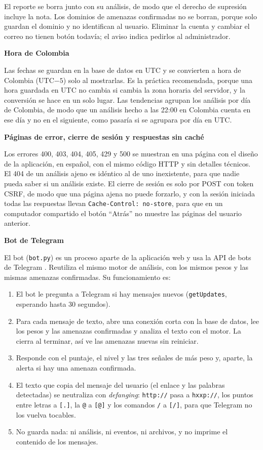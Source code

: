 \documentclass[journal,onecolumn,12pt,draftclsnofoot]{IEEEtran}
\newcommand{\apartado}[1]{\par\medskip\noindent\textbf{#1}\par\smallskip}
\begin{document}
El reporte se borra junto con su análisis, de modo que el derecho de supresión incluye la nota. Los dominios de amenazas confirmadas no se borran, porque solo guardan el dominio y no identifican al usuario. Eliminar la cuenta y cambiar el correo no tienen botón todavía; el aviso indica pedirlos al administrador.

\apartado{Hora de Colombia}

Las fechas se guardan en la base de datos en UTC y se convierten a hora de Colombia (UTC$-5$) solo al mostrarlas. Es la práctica recomendada, porque una hora guardada en UTC no cambia si cambia la zona horaria del servidor, y la conversión se hace en un solo lugar. Las tendencias agrupan los análisis por día de Colombia, de modo que un análisis hecho a las 22:00 en Colombia cuenta en ese día y no en el siguiente, como pasaría si se agrupara por día en UTC.

\apartado{Páginas de error, cierre de sesión y respuestas sin caché}

Los errores 400, 403, 404, 405, 429 y 500 se muestran en una página con el diseño de la aplicación, en español, con el mismo código HTTP y sin detalles técnicos. El 404 de un análisis ajeno es idéntico al de uno inexistente, para que nadie pueda saber si un análisis existe. El cierre de sesión es solo por POST con token CSRF, de modo que una página ajena no puede forzarlo, y con la sesión iniciada todas las respuestas llevan \texttt{Cache-Control: no-store}, para que en un computador compartido el botón ``Atrás'' no muestre las páginas del usuario anterior.

\apartado{Bot de Telegram}

El bot (\texttt{bot.py}) es un proceso aparte de la aplicación web y usa la API de bots de Telegram \cite{telegram}. Reutiliza el mismo motor de análisis, con los mismos pesos y las mismas amenazas confirmadas. Su funcionamiento es:

\begin{enumerate}
  \item El bot le pregunta a Telegram si hay mensajes nuevos (\texttt{getUpdates}, esperando hasta 30 segundos).
  \item Para cada mensaje de texto, abre una conexión corta con la base de datos, lee los pesos y las amenazas confirmadas y analiza el texto con el motor. La cierra al terminar, así ve las amenazas nuevas sin reiniciar.
  \item Responde con el puntaje, el nivel y las tres señales de más peso y, aparte, la alerta si hay una amenaza confirmada.
  \item El texto que copia del mensaje del usuario (el enlace y las palabras detectadas) se neutraliza con \emph{defanging}: \texttt{http://} pasa a \texttt{hxxp://}, los puntos entre letras a \texttt{[.]}, la \texttt{@} a \texttt{[@]} y los comandos \texttt{/} a \texttt{[/]}, para que Telegram no los vuelva tocables.
  \item No guarda nada: ni análisis, ni eventos, ni archivos, y no imprime el contenido de los mensajes.
\end{enumerate}
\end{document}
